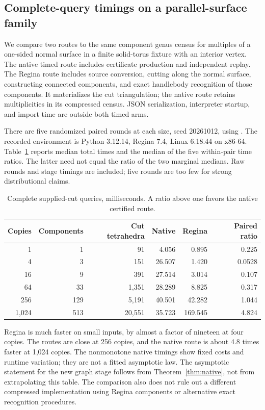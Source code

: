 \subsection{Complete-query timings on a parallel-surface family}
We compare two routes to the same component genus census for multiples
of a one-sided normal surface in a finite solid-torus fixture with an
interior vertex.  The native timed route includes certificate production
and independent replay.  The Regina route includes source conversion,
cutting along the normal surface, constructing connected components, and
exact handlebody recognition of those components.  It materializes the
cut triangulation; the native route retains multiplicities in its
compressed census.  JSON serialization, interpreter startup, and import
time are outside both timed arms.

There are five randomized paired rounds at each size, seed 20261012,
using .  The recorded environment is Python 3.12.14,
Regina 7.4, Linux 6.18.44 on x86-64.  Table~\ref{tab:native-timing}
reports median total times and the median of the five within-pair time
ratios.  The latter need not equal the ratio of the two marginal medians.
Raw rounds and stage timings are included; five rounds are too few for
strong distributional claims.

\begin{table}[htbp]
\centering\small
\caption{Complete supplied-cut queries, milliseconds.  A ratio above one
favors the native certified route.}
\label{tab:native-timing}
\begin{tabular}{rrrrrr}
\toprule
Copies & Components & Cut tetrahedra & Native & Regina & Paired ratio\\
\midrule
1 & 1 & 91 & 4.056 & 0.895 & 0.225\\
4 & 3 & 151 & 26.507 & 1.420 & 0.0528\\
16 & 9 & 391 & 27.514 & 3.014 & 0.107\\
64 & 33 & 1,351 & 28.289 & 8.825 & 0.317\\
256 & 129 & 5,191 & 40.501 & 42.282 & 1.044\\
1,024 & 513 & 20,551 & 35.723 & 169.545 & 4.824\\
\bottomrule
\end{tabular}
\end{table}

Regina is much faster on small inputs, by almost a factor of nineteen at
four copies.  The routes are close at 256 copies, and the native route
is about 4.8 times faster at 1,024 copies.  The nonmonotone native timings
show fixed costs and runtime variation; they are not a fitted asymptotic
law.  The asymptotic statement for the new graph stage follows from
Theorem~\ref{thm:native}, not from extrapolating this table.  The comparison
also does not rule out a different compressed implementation using Regina
components or alternative exact recognition procedures.

